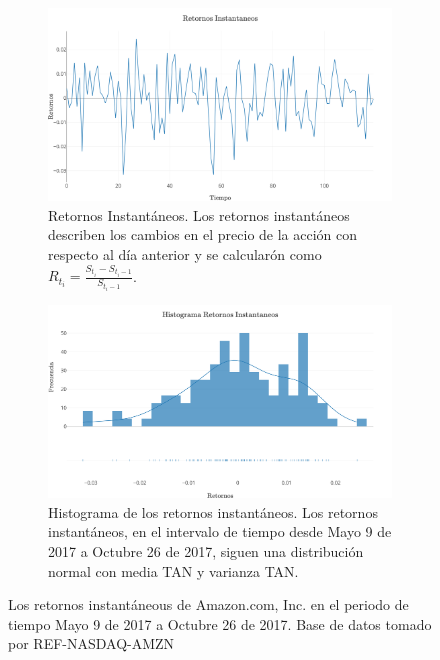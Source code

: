 \documentclass[]{elsarticle}
\begin{document}
\begin{figure}
  \centering
  \begin{subfigure}[ht]{\textwidth}
    \includegraphics[width=\textwidth]{noise.png}
    \caption{Retornos Instantáneos. Los retornos instantáneos describen los cambios en el precio de la acción con respecto al día anterior y se calcularón como $R_{t_i} = \frac{S_{t_i}-S_{t_i-1}}{S_{t_i-1}}$.  }
    \label{fig:retornos}
  \end{subfigure}
  
    \begin{subfigure}[ht]{\textwidth}
      \includegraphics[width=\textwidth]{hist.png}
      \caption{Histograma de los retornos instantáneos. Los retornos instantáneos, en el intervalo de tiempo desde Mayo 9 de 2017 a Octubre 26 de 2017, siguen una distribución normal con media TAN y varianza TAN.}
      \label{fig:histograma}
    \end{subfigure}
    \caption{Los retornos instantáneous de Amazon.com, Inc. en el periodo de tiempo Mayo 9 de 2017 a Octubre 26 de 2017. Base de datos tomado por REF-NASDAQ-AMZN }\label{fig:retornosyhistograma}
  \end{figure}
\end{document}
